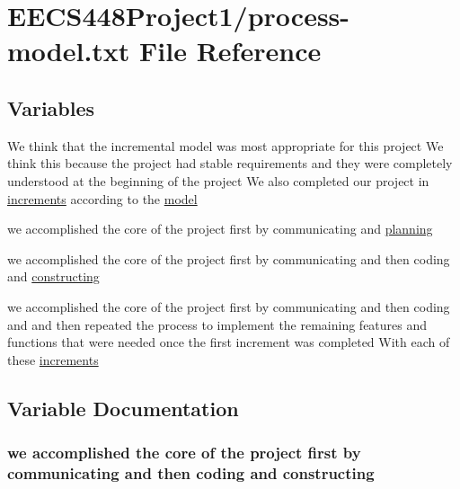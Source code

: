 \hypertarget{process-model_8txt}{}\section{E\+E\+C\+S448\+Project1/process-\/model.txt File Reference}
\label{process-model_8txt}
\subsection*{Variables}
\begin{DoxyCompactItemize}
\item 
We think that the incremental model was most appropriate for this project We think this because the project had stable requirements and they were completely understood at the beginning of the project We also completed our project in \hyperlink{process-model_8txt_aa72783f12faaa2e4a8dd5489f27105e3}{increments} according to the \hyperlink{process-model_8txt_a513e8e85a7bcfad5ea4f0f97e40c05cb}{model}
\item 
we accomplished the core of the project first by communicating and \hyperlink{process-model_8txt_a0e86255a3b931936544f6d40f758abca}{planning}
\item 
we accomplished the core of the project first by communicating and then coding and \hyperlink{process-model_8txt_a1be8cc530a3359176a1eb968c73438a4}{constructing}
\item 
we accomplished the core of the project first by communicating and then coding and and then repeated the process to implement the remaining features and functions that were needed once the first increment was completed With each of these \hyperlink{process-model_8txt_aa72783f12faaa2e4a8dd5489f27105e3}{increments}
\end{DoxyCompactItemize}


\subsection{Variable Documentation}
\subsubsection[{\texorpdfstring{constructing}{constructing}}]{\setlength{\rightskip}{0pt plus 5cm}we accomplished the core of the project first by communicating and then coding and constructing}\hypertarget{process-model_8txt_a1be8cc530a3359176a1eb968c73438a4}{}\label{process-model_8txt_a1be8cc530a3359176a1eb968c73438a4}

